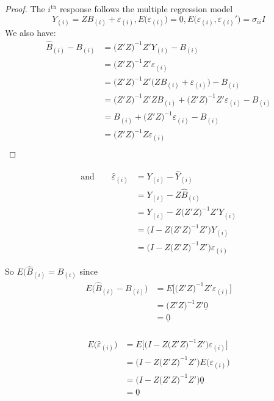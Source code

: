 \documentclass[11pt,a4paper]{article}
\theoremstyle{definition}
\begin{document}
\begin{proof}
The $i^{\text{th}}$ response follows the multiple regression model
$$Y_{(i)}=ZB_{(i)}+\varepsilon_{(i)},  E\big(\varepsilon_{(i)}\big)=\underline{0},  E\big(\varepsilon_{(i)},\varepsilon_{(i)}'\big)=\sigma_{ii}I$$
We also have:
\begin{align*}
\widehat{B}_{(i)} - B_{(i)} & = \big(Z'Z\big)^{-1}Z'Y_{(i)}-B_{(i)}\\
                        & = \big(Z'Z\big)^{-1}Z'\varepsilon_{(i)}\\
                        & = \big(Z'Z\big)^{-1}Z'\big(ZB_{(i)}+\varepsilon_{(i)}\big)-B_{(i)}\\
                        & = \big(Z'Z\big)^{-1}Z'ZB_{(i)} +\big(Z'Z\big)^{-1}Z'\varepsilon_{(i)}-B_{(i)}\\
                        & = B_{(i)} + \big(Z'Z\big)^{-1}\varepsilon_{(i)}-B_{(i)}\\
                        & = \big(Z'Z\big)^{-1}Z\varepsilon_{(i)}\\
\end{align*}
\end{proof}



\begin{align*}
\text{and}\qquad  \widehat{\varepsilon}_{(i)} & = Y_{(i)} - \widehat{Y}_{(i)}\\
                                               & = Y_{(i)} - Z\widehat{B}_{(i)}\\
                                               & = Y_{(i)} - Z\big(Z'Z\big)^{-1}Z'Y_{(i)}\\
                                               & = \big(I-Z\big(Z'Z\big)^{-1}Z'\big)Y_{(i)}\\
                                               & = \big(I-Z\big(Z'Z\big)^{-1}Z'\big)\varepsilon_{(i)}
\end{align*}


So $E\big(\widehat{B}_{(i)}=B_{(i)}$ since 
\begin{align*}
E\big(\widehat{B}_{(i)}-B_{(i)}\big) & = E\big[\big(Z'Z\big)^{-1}Z'\varepsilon_{(i)}\big]\\
                                 & = \big(Z'Z\big)^{-1}Z'\underline{0}\\
                                 & = \underline{0}\\
\end{align*}



\begin{align*}
E\big(\widehat{\varepsilon}_{(i)}\big) & = E\big[\big(I-Z\big(Z'Z\big)^{-1}Z'\big)\varepsilon_{(i)}\big]\\
                                   & = \big(I-Z\big(Z'Z\big)^{-1}Z'\big)E\big(\varepsilon_{(i)}\big)\\
                                   & = \big(I-Z\big(Z'Z\big)^{-1}Z'\big)\underline{0}\\
                                   & = \underline{0}\\
\end{align*}
\end{document}
